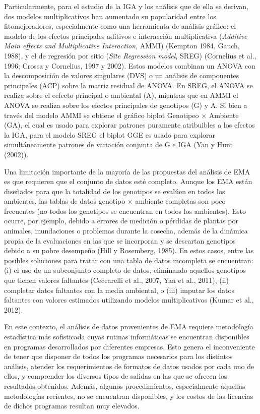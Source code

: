 Particularmente, para el estudio de la IGA y los análisis que de ella se derivan, dos modelos multiplicativos han aumentado su popularidad entre los fitomejoradores, especialmente como una herramienta de análisis gráfico: el modelo de los efectos principales aditivos e interacción multiplicativa (\emph{Additive Main effects and Multiplicative Interaction}, AMMI) (Kempton 1984, Gauch, 1988), y el de regresión por sitio (\emph{Site Regression model}, SREG) (Cornelius et al., 1996; Crossa y Cornelius, 1997 y 2002).  Estos modelos combinan un ANOVA con la descomposición de valores singulares (DVS) o un análisis de componentes principales (ACP) sobre la matriz residual de ANOVA. En SREG, el ANOVA se realiza sobre el eefecto principal o ambiental (A),  mientras que en AMMI el ANOVA se realiza sobre los efectos principales de genotipos (G) y A. Si bien a través del modelo AMMI se obtiene el gráfico biplot Genotipeo $\times$ Ambiente (GA), el cual es usado para explorar patrones puramente atribuibles a los efectos la IGA, para el modelo SREG el biplot GGE es usado para explorar simultáneamente patrones de variación conjunta de G e IGA (Yan y Hunt (2002)).

Una limitación importante de la mayoría de las propuestas del análisis de EMA es que requieren que el conjunto de datos esté completo. Aunque los EMA están diseñados para que la totalidad de los genotipos se evalúen en todos los ambientes,  las tablas de datos genotipo $\times$ ambiente completas son poco frecuentes (no todos los genotipos se encuentran en todos los ambientes). Esto ocurre, por ejemplo, debido a errores de medición o pérdidas de plantas por animales, inundaciones o problemas durante la cosecha, además de la dinámica propia de la evaluaciones en las que se incorporan y se descartan genotipos debido a su pobre desempeño (Hill y Rosemberg, 1985). En estos casos, entre las posibles soluciones para tratar con una tabla de datos incompleta se encuentran: (i) el uso de un subconjunto completo de datos, eliminando aquellos genotipos que tienen valores faltantes (Ceccarelli et al., 2007, Yan et al., 2011), (ii) completar datos faltantes con la media ambiental, o (iii) imputar los datos faltantes con valores estimados utilizando modelos multiplicativos (Kumar et al., 2012). 



En este contexto, el análisis de datos provenientes de EMA requiere metodología estadística más sofisticada cuyas rutinas informáticas se encuentran disponibles en programas desarrollados por diferentes empresas. Esto genera el inconveniente de tener que disponer de todos los programas necesarios para los distintos análisis, atender los requerimientos de formatos de datos usados por cada uno de ellos, y comprender los diversos tipos de salidas en las que se ofrecen los resultados obtenidos. Además, algunos procedimientos, especialmente aquellas metodologías recientes, no se encuentran disponibles, y los costos de las licencias de dichos programas resultan muy elevados. 

